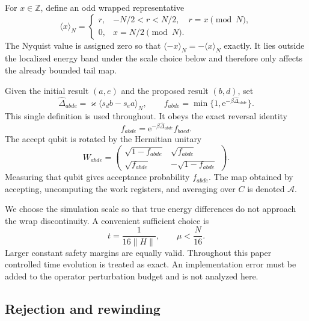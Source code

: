 \documentclass[aps,floatfix,10pt,amssymb,amsmath,superscriptaddress,nofootinbib,longbibliography,nobalancelastpage,twocolumn]{revtex4-2}
\newcommand{\cA}{\mathcal{A}}
\newcommand{\e}{\mathrm{e}}
\begin{document}
For $x\in\mathbb Z$, define an odd wrapped representative
\begin{equation}
 \langle x\rangle_N=\begin{cases}
 r,&-N/2<r<N/2,\quad r=x\pmod N,\\
 0,&x=N/2\pmod N.
 \end{cases}
 \label{eq:odd-wrap}
\end{equation}
The Nyquist value is assigned zero so that $\langle-x\rangle_N=-\langle x\rangle_N$ exactly.  It lies outside the localized energy band under the scale choice below and therefore only affects the already bounded tail map.

Given the initial result $(a,e)$ and the proposed result $(b,d)$, set
\begin{equation}
 \widehat\Delta_{abde}=\varkappa\langle s_db-s_ea\rangle_N,
 \qquad
 f_{abde}=\min\{1,\e^{-\beta\widehat\Delta_{abde}}\}.
 \label{eq:acceptance}
\end{equation}
This single definition is used throughout.  It obeys the exact reversal identity
\begin{equation}
 f_{abde}=\e^{-\beta\widehat\Delta_{abde}}f_{baed}.
 \label{eq:metropolis-identity}
\end{equation}
The accept qubit is rotated by the Hermitian unitary
\begin{equation}
 W_{abde}=\begin{pmatrix}
 \sqrt{1-f_{abde}}&\sqrt{f_{abde}}\\
 \sqrt{f_{abde}}&-\sqrt{1-f_{abde}}
 \end{pmatrix}.
 \label{eq:W}
\end{equation}
Measuring that qubit gives acceptance probability $f_{abde}$.  The map obtained by accepting, uncomputing the work registers, and averaging over $C$ is denoted $\cA$.

We choose the simulation scale so that true energy differences do not approach the wrap discontinuity.  A convenient sufficient choice is
\begin{equation}
 t=\frac{1}{16\|H\|},\qquad \mu<\frac{N}{16}.
 \label{eq:time-choice}
\end{equation}
Larger constant safety margins are equally valid.  Throughout this paper controlled time evolution is treated as exact.  An implementation error must be added to the operator perturbation budget and is not analyzed here.

\subsection{Rejection and rewinding}
\end{document}
